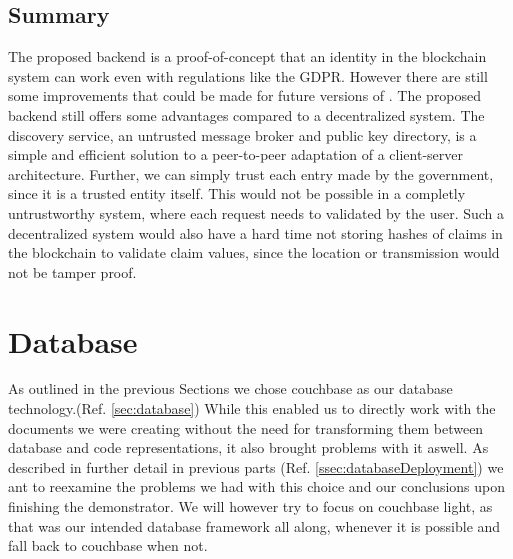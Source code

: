\subsection{Summary}
The proposed backend is a proof-of-concept that an identity in the blockchain system can work even with regulations like the GDPR. However there are still some improvements that could be made for future versions of \projectName{}. The proposed backend still offers some advantages compared to a decentralized system. The discovery service, an untrusted message broker and public key directory, is a simple and efficient solution to a peer-to-peer adaptation of a client-server architecture. Further, we can simply trust each entry made by the government, since it is a trusted entity itself. This would not be possible in a completly untrustworthy system, where each request needs to validated by the user. Such a decentralized system would also have a hard time not storing hashes of claims in the blockchain to validate claim values, since the location or transmission would not be tamper proof. 

\section{Database}
\label{sec:databaseEval}
As outlined in the previous Sections we chose couchbase as our database technology.(Ref. \ref{sec:database}) While this enabled us to directly work with the documents we were creating without the need for transforming them between database and code representations, it also brought problems with it aswell.
As described in further detail in previous parts (Ref. \ref{ssec:databaseDeployment}) we ant to reexamine the problems we had with this choice and our conclusions upon finishing the demonstrator. We will however try to focus on couchbase light, as that was our intended database framework all along, whenever it is possible and fall back to couchbase when not.

